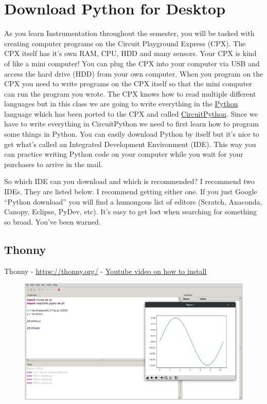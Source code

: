 \section{Download Python for Desktop}

As you learn Instrumentation throughout the semester, you will be
tasked with creating computer programs on the Circuit Playground
Express (CPX). The CPX itself has it’s own RAM, CPU, HDD and many
sensors. Your CPX is kind of like a mini computer! You can plug the
CPX into your computer via USB and access the hard drive (HDD) from
your own computer. When you program on the CPX you need to write
programs on the CPX itself so that the mini computer can run the
program you wrote. The CPX knows how to read multiple different
languages but in this class we are going to write everything in the
\href{https://www.python.org/}{Python} language which has been ported
to the CPX and called
\href{https://circuitpython.org/}{CircuitPython}. Since we have to
write everything in CircuitPython we 
need to first learn how to program some things in Python. You can
easily download Python by itself but it’s nice to get what’s called an
Integrated Development Environment (IDE). This way you can practice
writing Python code on your computer while you wait for your purchases
to arrive in the mail. 

So which IDE can you download and which is recommended? I recommend
two IDEs. They are listed below. I recommend getting either one. If
you just Google “Python download” you will find a humongous list of
editors (Scratch, Anaconda, Canopy, Eclipse, PyDev, etc). It’s easy to
get lost when searching for something so broad. You’ve been warned.

\subsection{Thonny}

Thonny - \url{https://thonny.org/} -
\href{https://www.youtube.com/watch?v=qaxukpYRqfA&list=PL_D7_GvGz-v1RsDs_OdNW65qRjEjmpfQx&index=14}{Youtube
  video on how to install}

\begin{figure}[H]
  \begin{center}
    \includegraphics[width=\textwidth]{Figures/Thonny.png}
  \end{center}
\end{figure}

